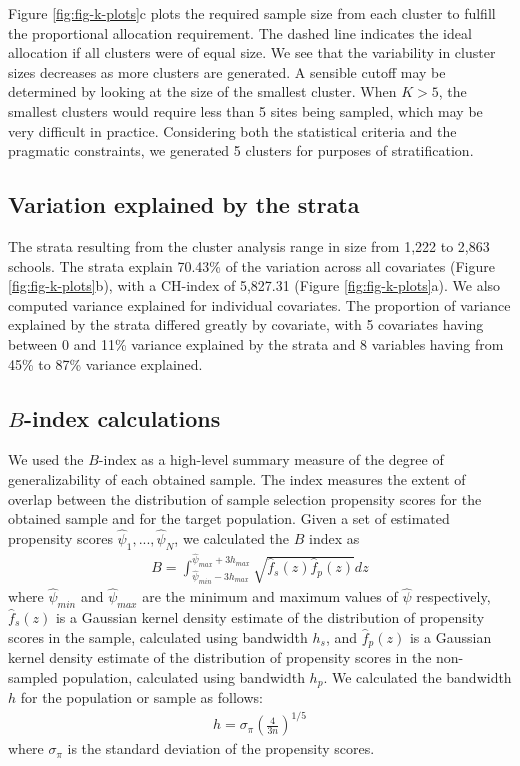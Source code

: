 \documentclass[
  man,floatsintext]{apa6}
\begin{document}
Figure \ref{fig:fig-k-plots}c plots the required sample size from each cluster to fulfill the proportional allocation requirement. The dashed line indicates the ideal allocation if all clusters were of equal size. We see that the variability in cluster sizes decreases as more clusters are generated. A sensible cutoff may be determined by looking at the size of the smallest cluster. When \(K > 5\), the smallest clusters would require less than 5 sites being sampled, which may be very difficult in practice. Considering both the statistical criteria and the pragmatic constraints, we generated 5 clusters for purposes of stratification.

\hypertarget{variation-explained}{%
\subsection{Variation explained by the strata}\label{variation-explained}}

The strata resulting from the cluster analysis range in size from 1,222 to 2,863 schools. The strata explain 70.43\% of the variation across all covariates (Figure \ref{fig:fig-k-plots}b), with a CH-index of 5,827.31 (Figure \ref{fig:fig-k-plots}a). We also computed variance explained for individual covariates. The proportion of variance explained by the strata differed greatly by covariate, with 5 covariates having between 0 and 11\% variance explained by the strata and 8 variables having from 45\% to 87\% variance explained.

\hypertarget{B-index}{%
\subsection{\texorpdfstring{\(B\)-index calculations}{B-index calculations}}\label{B-index}}

We used the \(B\)-index as a high-level summary measure of the degree of generalizability of each obtained sample. The index measures the extent of overlap between the distribution of sample selection propensity scores for the obtained sample and for the target population.
Given a set of estimated propensity scores \(\hat\psi_1,...,\hat\psi_N\), we calculated the \(B\) index as
\begin{align}
B = \int_{\hat\psi_{min}-3h_{max}}^{\hat\psi_{max}+3h_{max}}\sqrt{\hat{f}_s(z)\hat{f}_p(z)}dz
\end{align}
where \(\hat\psi_{min}\) and \(\hat\psi_{max}\) are the minimum and maximum values of \(\hat\psi\) respectively, \(\hat{f}_s(z)\) is a Gaussian kernel density estimate of the distribution of propensity scores in the sample, calculated using bandwidth \(h_s\), and \(\hat{f}_p(z)\) is a Gaussian kernel density estimate of the distribution of propensity scores in the non-sampled population, calculated using bandwidth \(h_p\). We calculated the bandwidth \(h\) for the population or sample as follows:
\begin{align}
h = \sigma_{\pi}\left(\frac{4}{3n}\right)^{1/5}
\end{align}
where \(\sigma_{\pi}\) is the standard deviation of the propensity scores.
\end{document}
